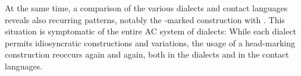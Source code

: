 At the same time, a comparison of  the various dialects and contact languages reveals also recurring patterns, notably the \cst-marked construction with  \secns. This situation is symptomatic of the entire AC system of  dialects: While each dialect permits idiosyncratic constructions and variations, the usage of a head-marking construction reoccurs again and again, both in the  dialects and in the contact languages. 







